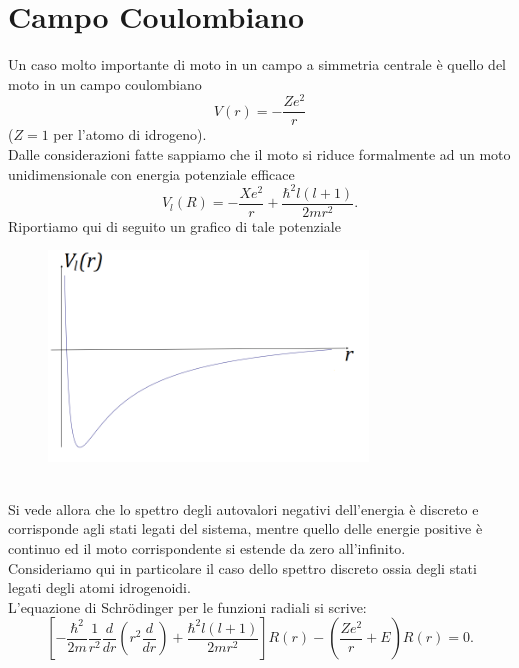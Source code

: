 \section{Campo Coulombiano}
Un caso molto importante di  moto in un campo a simmetria centrale è quello del moto in un campo coulombiano
\begin{equation}
V\left(r\right)=-\frac{Ze^2}{r} 
\end{equation}
($Z=1$ per l'atomo di idrogeno).\\
Dalle considerazioni fatte sappiamo che il moto si riduce formalmente ad un moto unidimensionale con energia potenziale efficace
\begin{equation}
V_l\left(R\right)=-\frac{Xe^2}{r}+\frac{\hbar^2l\left(l+1\right)}{2mr^2} .
\end{equation}
Riportiamo qui di seguito un grafico di tale potenziale\\
\begin{figure}[!htbp]
\begin{center}
\includegraphics[width=8.5cm]{immagini/cap_21/fig_21_1.png}
\end{center}
\end{figure}\\
Si vede allora che lo spettro degli autovalori negativi dell'energia è discreto e corrisponde agli stati legati del sistema, mentre quello delle energie positive è continuo ed il moto corrispondente si estende da zero all'infinito.\\
Consideriamo qui in particolare il caso dello spettro discreto ossia degli stati legati degli atomi idrogenoidi.\\
L'equazione di Schr\"{o}dinger per le funzioni radiali si scrive:
\begin{equation}
\left[-\frac{\hbar^2}{2m}\frac{1}{r^2}\frac{d}{d r}\left(r^2\frac{d}{d r}\right)+\frac{\hbar^2l\left(l+1\right)}{2mr^2}\right]R\left(r\right)-\left(\frac{Ze^2}{r}+E\right)R\left(r\right)=0 .
\label{21.4}
\end{equation}

